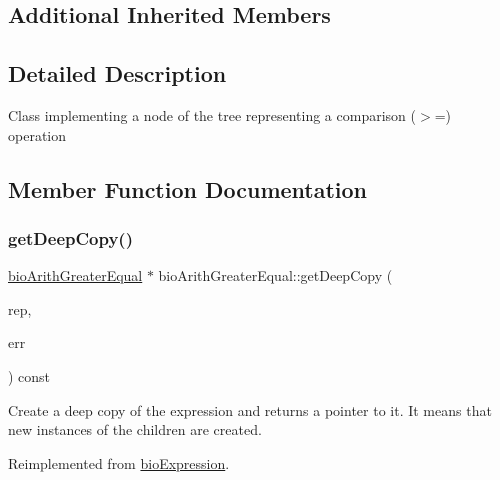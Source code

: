 \subsection*{Additional Inherited Members}


\subsection{Detailed Description}
Class implementing a node of the tree representing a comparison ($>$=) operation 

\subsection{Member Function Documentation}
\mbox{\label{classbio_arith_greater_equal_aa5ff24eef069374f9c8778ab8569ff7d}} 
\subsubsection{\texorpdfstring{get\+Deep\+Copy()}{getDeepCopy()}}
{\footnotesize\ttfamily \hyperlink{classbio_arith_greater_equal}{bio\+Arith\+Greater\+Equal} $\ast$ bio\+Arith\+Greater\+Equal\+::get\+Deep\+Copy (\begin{DoxyParamCaption}\item[{\hyperlink{classbio_expression_repository}{bio\+Expression\+Repository} $\ast$}]{rep,  }\item[{pat\+Error $\ast$\&}]{err }\end{DoxyParamCaption}) const\hspace{0.3cm}{\ttfamily [virtual]}}

Create a deep copy of the expression and returns a pointer to it. It means that new instances of the children are created. 

Reimplemented from \hyperlink{classbio_expression_a4ee1b8add634078a02eaae26cd40dcc8}{bio\+Expression}.

\mbox{\label{classbio_arith_greater_equal_a6964afaf174b6e1de101f2439e266477}} 
